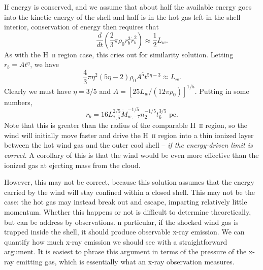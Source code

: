 If energy is conserved, and we assume that about half the available energy goes into the kinetic energy of the shell and half is in the hot gas left in the shell interior, conservation of energy then requires that
\begin{equation}
\frac{d}{dt} \left(\frac{2}{3}\pi \rho_0 r_b^3 \dot{r}_b^2\right) \approx \frac{1}{2} L_w.
\end{equation}
As with the H~\textsc{ii} region case, this cries out for similarity solution. Letting $r_b = A t^\eta$, we have
\begin{equation}
\frac{4}{3} \pi \eta^2 (5\eta-2) \rho_0 A^5 t^{5\eta-3} \approx L_w.
\end{equation}
Clearly we must have $\eta=3/5$ and $A=[25 L_w/(12\pi \rho_0)]^{1/5}$. Putting in some numbers,
\begin{equation}
r_b = 16 L_{*,5}^{2/5} \dot{M}_{w,-7}^{-1/5} n_2^{-1/5} t_6^{3/5}\mbox{ pc}.
\end{equation}
Note that this is greater than the radius of the comparable H~\textsc{ii} region, so the wind will initially move faster and drive the H~\textsc{ii} region into a thin ionized layer between the hot wind gas and the outer cool shell -- {\it if the energy-driven limit is correct}. A corollary of this is that the wind would be even more effective than the ionized gas at ejecting mass from the cloud.

However, this may not be correct, because this solution assumes that the energy carried by the wind will stay confined within a closed shell. This may not be the case: the hot gas may instead break out and escape, imparting relatively little momentum. Whether this happens or not is difficult to determine theoretically, but can be address by observations. n particular, if the shocked wind gas is trapped inside the shell, it should produce observable x-ray emission. We can quantify how much x-ray emission we should see with a straightforward argument. It is easiest to phrase this argument in terms of the pressure of the x-ray emitting gas, which is essentially what an x-ray observation measures.

